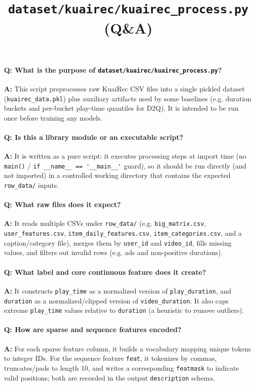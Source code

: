 \documentclass[11pt]{article}
\title{\texttt{dataset/kuairec/kuairec\_process.py} (Q\&A)}
\author{}
\date{}
\begin{document}
\maketitle

\paragraph{Q: What is the purpose of \texttt{dataset/kuairec/kuairec\_process.py}?}
\textbf{A:} This script preprocesses raw KuaiRec CSV files into a single pickled dataset (\lstinline|kuairec_data.pkl|) plus auxiliary artifacts used by some baselines (e.g. duration buckets and per-bucket play-time quantiles for D2Q). It is intended to be run once before training any models.

\paragraph{Q: Is this a library module or an executable script?}
\textbf{A:} It is written as a pure script: it executes processing steps at import time (no \lstinline|main()| / \lstinline|if __name__ == '__main__'| guard), so it should be run directly (and not imported) in a controlled working directory that contains the expected \lstinline|row_data/| inputs.

\paragraph{Q: What raw files does it expect?}
\textbf{A:} It reads multiple CSVs under \lstinline|row_data/| (e.g. \lstinline|big_matrix.csv|, \lstinline|user_features.csv|, \lstinline|item_daily_features.csv|, \lstinline|item_categories.csv|, and a caption/category file), merges them by \lstinline|user_id| and \lstinline|video_id|, fills missing values, and filters out invalid rows (e.g. ads and non-positive durations).

\paragraph{Q: What label and core continuous feature does it create?}
\textbf{A:} It constructs \lstinline|play_time| as a normalized version of \lstinline|play_duration|, and \lstinline|duration| as a normalized/clipped version of \lstinline|video_duration|. It also caps extreme \lstinline|play_time| values relative to \lstinline|duration| (a heuristic to remove outliers).

\paragraph{Q: How are sparse and sequence features encoded?}
\textbf{A:} For each sparse feature column, it builds a vocabulary mapping unique tokens to integer IDs. For the sequence feature \lstinline|feat|, it tokenizes by commas, truncates/pads to length 10, and writes a corresponding \lstinline|featmask| to indicate valid positions; both are recorded in the output \lstinline|description| schema.
\end{document}
